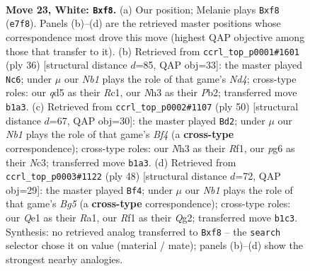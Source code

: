 \documentclass[11pt]{article}
\begin{document}
\clearpage

\begin{figure}[p]\centering
\begin{subfigure}{0.46\textwidth}\centering
\resizebox{\linewidth}{!}{%
\newchessgame
\chessboard[
  setfen={1n3rk1/4Bp2/5np1/3q3p/2pp3P/3P2PN/4PP2/rN2QRK1 w - - 0 23},
  showmover=false,
  pgfstyle=straightmove, color=movearrow, markmove={e7-f8}
]}
\caption{}
\end{subfigure}\hfill
\begin{subfigure}{0.46\textwidth}\centering
\resizebox{\linewidth}{!}{%
\newchessgame
\chessboard[
  setfen={r5k1/p3qpp1/1p2p1np/3r4/3N1P2/P3P3/1P2Q1PP/2RR2K1 w - - 1 19},
  showmover=false,
  pgfstyle=straightmove, color=movearrow, markmove={d4-c6}
]}
\caption{}
\end{subfigure}
\\[4pt]
\begin{subfigure}{0.46\textwidth}\centering
\resizebox{\linewidth}{!}{%
\newchessgame
\chessboard[
  setfen={2r1r1k1/p4p1p/1p1p1qp1/3P4/2P2BPn/1PN3QP/P7/5RK1 w - - 5 26},
  showmover=false,
  pgfstyle=straightmove, color=movearrow, markmove={f4-d2}
]}
\caption{}
\end{subfigure}\hfill
\begin{subfigure}{0.46\textwidth}\centering
\resizebox{\linewidth}{!}{%
\newchessgame
\chessboard[
  setfen={5rk1/1pq3p1/3nppN1/np1p2B1/3P4/2P1PP2/P5QP/R5K1 w - - 2 25},
  showmover=false,
  pgfstyle=straightmove, color=movearrow, markmove={g5-f4}
]}
\caption{}
\end{subfigure}
\caption{\textbf{Move 23, White: \texttt{Bxf8}.} (a) Our position; Melanie plays \texttt{Bxf8} (\texttt{e7f8}). Panels (b)--(d) are the retrieved master positions whose correspondence most drove this move (highest QAP objective among those that transfer to it). (b) Retrieved from \texttt{ccrl\_top\_p0001\#1601} (ply 36) [structural distance $d$=85, QAP obj=33]: the master played \texttt{Nc6}; under $\mu$ our \emph{Nb1} plays the role of that game's \emph{Nd4}; cross-type roles: our \emph{q}d5 as their \emph{R}c1, our \emph{N}h3 as their \emph{P}b2; transferred move \texttt{b1a3}. (c) Retrieved from \texttt{ccrl\_top\_p0002\#1107} (ply 50) [structural distance $d$=67, QAP obj=30]: the master played \texttt{Bd2}; under $\mu$ our \emph{Nb1} plays the role of that game's \emph{Bf4} (a \textbf{cross-type} correspondence); cross-type roles: our \emph{N}h3 as their \emph{R}f1, our \emph{p}g6 as their \emph{N}c3; transferred move \texttt{b1a3}. (d) Retrieved from \texttt{ccrl\_top\_p0003\#1122} (ply 48) [structural distance $d$=72, QAP obj=29]: the master played \texttt{Bf4}; under $\mu$ our \emph{Nb1} plays the role of that game's \emph{Bg5} (a \textbf{cross-type} correspondence); cross-type roles: our \emph{Q}e1 as their \emph{R}a1, our \emph{R}f1 as their \emph{Q}g2; transferred move \texttt{b1c3}. Synthesis: no retrieved analog transferred to \texttt{Bxf8} -- the \texttt{search} selector chose it on value (material / mate); panels (b)--(d) show the strongest nearby analogies.}
\label{fig:thought-m44}
\end{figure}
\end{document}
